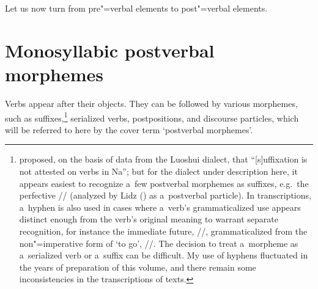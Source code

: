 Let us now turn from pre"=verbal elements to post"=verbal elements.


\section{Monosyllabic postverbal morphemes}
\label{sec:verbalsuffixesandverbserializationmonosyllabicelements}

Verbs appear after their objects. They can be followed by various morphemes, such as suffixes,\footnote{\citet[349]{lidz2010} proposed, on the basis of data from the Luoshui dialect, that “[s]uffixation is not attested on verbs in Na”; but for the dialect under description here, it appears easiest to recognize a~few postverbal morphemes as suffixes, e.g.~the {perfective} \mbox{//} (analyzed by Lidz (\citeyear[424]{lidz2010}) as a~postverbal particle). In transcriptions, a~hyphen is also used in cases where a~verb's grammaticalized use appears distinct enough from the verb's original meaning to warrant separate recognition, for instance the {immediate future}, //, grammaticalized from the non"={imperative} form of ‘to go’, //. The decision to treat a~morpheme as a~serialized verb or a~{suffix} can be difficult. My use of hyphens fluctuated in the years of preparation of this volume, and there remain some inconsistencies in the transcriptions of texts.} serialized verbs, postpositions, and discourse particles, which will be referred to here by the cover term ‘postverbal morphemes'. 

